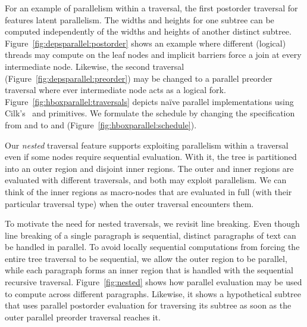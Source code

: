 For an example of parallelism within a traversal, the first postorder traversal for \hlang features latent parallelism. The widths and heights for one subtree can be computed independently of the widths and heights of another distinct subtree. Figure~\ref{fig:depsparallel:postorder} shows an example where different (logical) threads may compute on the leaf nodes and implicit barriers force a join at every intermediate node. Likewise, the second traversal (Figure~\ref{fig:depsparallel:preorder}) may be changed to a parallel preorder traversal where ever intermediate node acts as a logical fork. Figure~\ref{fig:hboxparallel:traversals} depicts na\"{i}ve parallel implementations using Cilk's~\cite{??}  and  primitives. We formulate the schedule by changing the specification from  and  to  and  (Figure~\ref{fig:hboxparallel:schedule}).


Our \emph{nested} traversal feature supports exploiting parallelism within a traversal even if some nodes require sequential evaluation.  With it, the tree is partitioned into an outer region and disjoint inner regions.  The outer and inner regions are evaluated with different traversals, and both may exploit parallelism.  We can think of the inner regions as macro-nodes that are evaluated in full (with their particular traversal type) when the outer traversal encounters them.  

To motivate the need for nested traversals, we revisit line breaking.  Even though line breaking of a single paragraph is sequential, distinct paragraphs of text can be handled in parallel.  To avoid locally sequential computations from forcing the entire tree traversal to be sequential, we allow the outer region to be parallel, while each paragraph forms an inner region that is handled with the sequential recursive traversal. Figure~\ref{fig:nested} shows how parallel evaluation may be used to compute across different  paragraphs. Likewise, it shows a hypothetical  subtree that uses parallel postorder evaluation for traversing its subtree as soon as the outer parallel preorder traversal reaches it.


